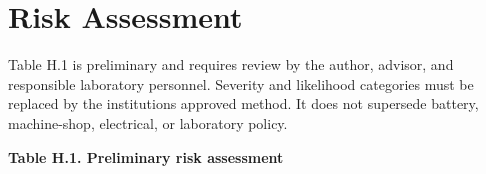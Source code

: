 \chapter{Risk Assessment}\label{ch:risk-assessment}

Table H.1 is preliminary and requires review by the author, advisor, and
responsible laboratory personnel. Severity and likelihood categories
must be replaced by the institution\textquotesingle s approved method.
It does not supersede battery, machine-shop, electrical, or laboratory
policy.

\clearpage
\begin{landscape}
\par\medskip\noindent\singlespacing
{}
\textbf{Table H.1. Preliminary risk assessment}\par


\end{landscape}
